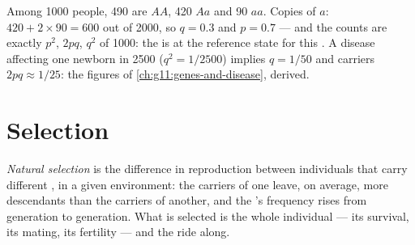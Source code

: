 \begin{example}\label{ex:g12:selection-drift-speciation:count}
Among 1000 people, 490 are $AA$, 420 $Aa$ and 90 $aa$. Copies of $a$:
$420 + 2 \times 90 = 600$ out of 2000, so $q = 0.3$ and $p = 0.7$ ---
and the  counts are exactly $p^2$, $2pq$, $q^2$ of 1000: the
 is at the reference state for this . A  disease
affecting one newborn in 2500 ($q^2 = 1/2500$) implies $q = 1/50$ and
carriers $2pq \approx 1/25$: the figures of
\cref{ch:g11:genes-and-disease}, derived.
\end{example}

\section{Selection}

\begin{definition}\label{def:g12:selection-drift-speciation:selection}
\emph{Natural selection} is the difference in
reproduction between individuals that carry different , in a
given environment: the carriers of one  leave, on average, more
descendants than the carriers of another, and the 's frequency
rises from generation to generation. What is selected is the whole
individual --- its survival, its mating, its fertility --- and the
 ride along.
\end{definition}

